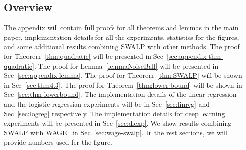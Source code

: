 \onecolumn

\begin{appendices}

\newtheorem{innercustomgeneric}{\customgenericname}
\providecommand{\customgenericname}{}
\newcommand{\newcustomtheorem}[2]{%
  \newenvironment{#1}[1]
  {%
   \renewcommand\customgenericname{#2}%
   \renewcommand\theinnercustomgeneric{##1}%
   \innercustomgeneric
  }
  {\endinnercustomgeneric}
}

\newcustomtheorem{customthm}{Theorem}
\newcustomtheorem{customlemma}{Lemma}


\renewcommand{\qedsymbol}{$\blacksquare$}
\newcommand{\R}[0]{\mathbb{R}}
\newcommand{\Prob}[1]{\mathbf{P}\left( #1 \right) }
\newcommand{\Exv}[1]{\mathbb{E}\left[ #1 \right]}
\newcommand{\Exvud}[2]{\mathbb{E}_{#1}\left[ #2 \right]}
\newcommand{\norm}[1]{\left\| #1 \right\|}
\newcommand{\Abs}[1]{\left| #1 \right| }

\section{Overview}
The appendix will contain full proofs for all theorems and lemmas in the main paper, implementation details for all the experiments, statistics for the figures, and some additional results combining SWALP with other methods.
The proof for Theorem~\ref{thm:quadratic} will be presented in Sec~\ref{sec:appendix-thm-quadratic}. 
The proof for Lemma~\ref{lemmaNoiseBall} will be presented in Sec~\ref{sec:appendix-lemma}.
The proof for Theorem~\ref{thm:SWALP} will be shown in Sec~\ref{sec:thm4.3}.
The proof for Theorem~\ref{thm:lower-bound} will be shown in Sec~\ref{sec:thm-lowerbound}.
The implementation details of the linear regression and the logistic regression experiments will be in Sec~\ref{sec:linreg} and Sec~\ref{sec:logreg} respectively.
The implementation details for deep learning experiments will be presented in Sec~\ref{sec:dlexp}.
We show results combining SWALP with WAGE~\cite{WAGE} in Sec~\ref{sec:wage-swalp}.
In the rest sections, we will provide numbers used for the figure.








\end{appendices}
